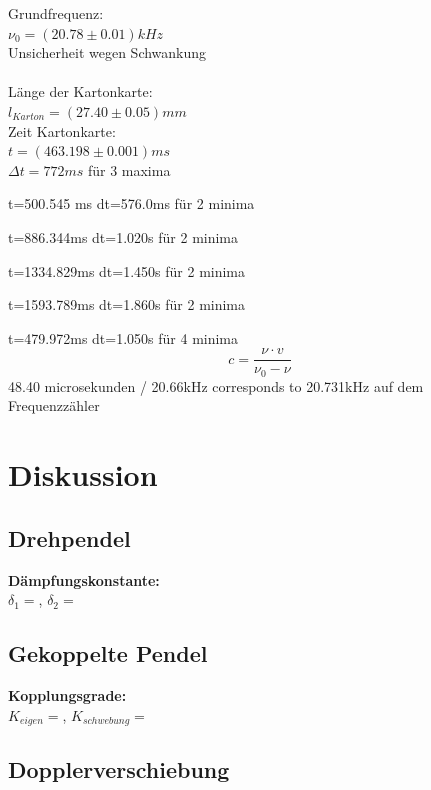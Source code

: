 \documentclass{article}
\begin{document}
Grundfrequenz:\\
$\nu_0=(20.78 \pm 0.01)\si{kHz}$\\
Unsicherheit wegen Schwankung\\
\\
Länge der Kartonkarte:\\
$l_{Karton}=(27.40 \pm 0.05)\si{mm}$\\

Zeit Kartonkarte:\\
$t=(463.198 \pm 0.001)\si{ms}$\\

$\Delta t=772ms$ für 3 maxima

t=500.545 ms
dt=576.0ms für 2 minima

t=886.344ms
dt=1.020s für 2 minima

t=1334.829ms
dt=1.450s für 2 minima

t=1593.789ms
dt=1.860s für 2 minima

t=479.972ms
dt=1.050s für 4 minima
\begin{equation}
\label{Schallgeschw}
c=\frac{\nu\cdot v}{\nu_{0}-\nu}
\end{equation}
48.40 microsekunden / 20.66kHz corresponds to 20.731kHz auf dem Frequenzzähler

\section{Diskussion}
\subsection*{Drehpendel}
\textbf{Dämpfungskonstante:}\\
$\delta_1=$, $\delta_2=$

\subsection*{Gekoppelte Pendel}
\textbf{Kopplungsgrade:}\\
$K_{eigen}=$, $K_{schwebung}=$
\subsection*{Dopplerverschiebung}



\end{document}
